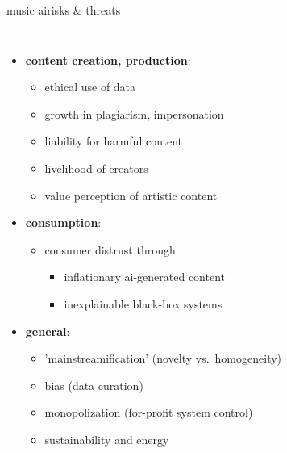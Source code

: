 \begin{frame}{music ai}{risks \& threats}
    \vspace{-7mm}
    \begin{columns}
        \begin{itemize}
            \item \textbf{content creation, production}:
                \begin{itemize}
                    \item ethical use of data
                    \item growth in plagiarism, impersonation
                    \item liability for harmful content
                    \item livelihood of  creators
                    \item value perception of artistic content
                \end{itemize}
            \smallskip
            \item<2-> \textbf{consumption}:
                \begin{itemize}
                    \item consumer distrust through 
                        \begin{itemize}
                            \item inflationary ai-generated content
                            \item inexplainable black-box systems
                        \end{itemize}
                \end{itemize}
            \smallskip
            \item<3-> \textbf{general}:
                \begin{itemize}
                    \item 'mainstreamification' (novelty vs.\ homogeneity)
                    \item bias (data curation)
                    \item monopolization (for-profit system control)
                    \item sustainability and energy 
                \end{itemize}
        \end{itemize}
        \begin{figure}
            \vspace{10mm}

\end{figure}
\end{columns}
\end{frame}
